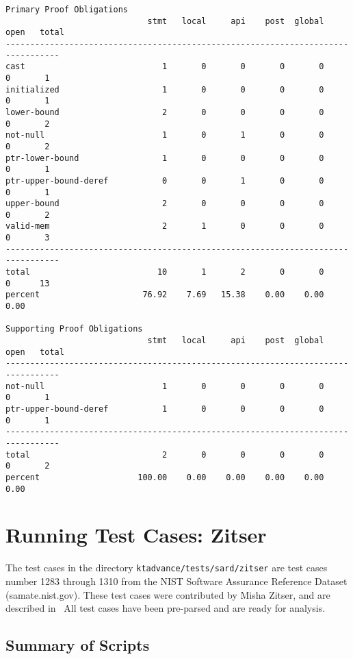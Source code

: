 \documentclass[11pt]{article}
\begin{document}
\begin{small}
\begin{verbatim}
Primary Proof Obligations
                             stmt   local     api    post  global    open   total
---------------------------------------------------------------------------------
cast                            1       0       0       0       0       0       1
initialized                     1       0       0       0       0       0       1
lower-bound                     2       0       0       0       0       0       2
not-null                        1       0       1       0       0       0       2
ptr-lower-bound                 1       0       0       0       0       0       1
ptr-upper-bound-deref           0       0       1       0       0       0       1
upper-bound                     2       0       0       0       0       0       2
valid-mem                       2       1       0       0       0       0       3
---------------------------------------------------------------------------------
total                          10       1       2       0       0       0      13
percent                     76.92    7.69   15.38    0.00    0.00    0.00

Supporting Proof Obligations
                             stmt   local     api    post  global    open   total
---------------------------------------------------------------------------------
not-null                        1       0       0       0       0       0       1
ptr-upper-bound-deref           1       0       0       0       0       0       1
---------------------------------------------------------------------------------
total                           2       0       0       0       0       0       2
percent                    100.00    0.00    0.00    0.00    0.00    0.00
\end{verbatim}
\end{small}

\section{Running Test Cases: Zitser}

The test cases in the directory {\tt ktadvance/tests/sard/zitser} 
are test cases number 1283 through 1310 from the NIST Software Assurance Reference Dataset
(samate.nist.gov). These test cases were contributed by Misha Zitser, and are described 
in~\cite{DBLP:conf/sigsoft/ZitserLL04}
All test cases have been pre-parsed and are ready for analysis.

\subsection{Summary of Scripts}
\end{document}
